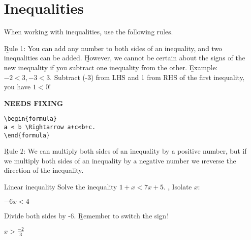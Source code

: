 \documentclass[../../main.tex]{subfiles}
\begin{document}
\section{Inequalities}
When working with inequalities, use the following rules.

\b{Rule 1}: You can add any number to both sides of an inequality, and two inequalities can be added. \b{However}, we cannot be certain about the signs of the new inequality if you subtract one inequality from the other. %
\b{Example}: $-2 < 3, -3 < 3.$
Subtract (-3) from LHS and 1 from RHS of the first inequality, you have $1 < 0$! %


{\hfill\Large\bfseries NEEDS FIXING\hfill}
\begin{lstlisting}
\begin{formula}
a < b \Rightarrow a+c<b+c.
\end{formula}
 \end{lstlisting} %

\b{Rule 2}: We can multiply both sides of an inequality by a positive number, but if we multiply both sides of an inequality by a negative number we \i{reverse} the direction of the inequality. %

\begin{example}{Linear inequality}
Solve the inequality $1+x<7x+5$.
\sep
Isolate $x$:
\begin{center}
\centering $-6x < 4$
\end{center}
Divide both sides by -6.
\b{Remember to switch the sign!}

\begin{center}
\centering $x>\frac{-2}{3}$
\end{center}
\end{example}
\end{document}
